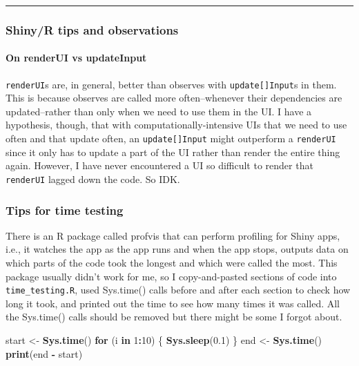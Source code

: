 \documentclass[]{article}
\newenvironment{Shaded}{\begin{snugshade}}{\end{snugshade}}
\newcommand{\KeywordTok}[1]{\textcolor[rgb]{0.13,0.29,0.53}{\textbf{#1}}}
\newcommand{\DecValTok}[1]{\textcolor[rgb]{0.00,0.00,0.81}{#1}}
\newcommand{\FloatTok}[1]{\textcolor[rgb]{0.00,0.00,0.81}{#1}}
\newcommand{\StringTok}[1]{\textcolor[rgb]{0.31,0.60,0.02}{#1}}
\newcommand{\ControlFlowTok}[1]{\textcolor[rgb]{0.13,0.29,0.53}{\textbf{#1}}}
\newcommand{\OperatorTok}[1]{\textcolor[rgb]{0.81,0.36,0.00}{\textbf{#1}}}
\newcommand{\NormalTok}[1]{#1}
\let\oldparagraph\paragraph
\renewcommand{\paragraph}[1]{\oldparagraph{#1}\mbox{}}
\begin{document}
\begin{center}\rule{0.5\linewidth}{\linethickness}\end{center}

\hypertarget{observations}{\subsubsection{Shiny/R tips and
observations}\label{observations}}

\paragraph{On renderUI vs updateInput}\label{on-renderui-vs-updateinput}

\texttt{renderUI}s are, in general, better than observes with
\texttt{update{[}{]}Input}s in them. This is because observes are called
more often--whenever their dependencies are updated--rather than only
when we need to use them in the UI. I have a hypothesis, though, that
with computationally-intensive UIs that we need to use often and that
update often, an \texttt{update{[}{]}Input} might outperform a
\texttt{renderUI} since it only has to update a part of the UI rather
than render the entire thing again. However, I have never encountered a
UI so difficult to render that \texttt{renderUI} lagged down the code.
So IDK.

\hypertarget{time-testing}{\subsubsection{Tips for time
testing}\label{time-testing}}

There is an R package called profvis that can perform profiling for
Shiny apps, i.e., it watches the app as the app runs and when the app
stops, outputs data on which parts of the code took the longest and
which were called the most. This package usually didn't work for me, so
I copy-and-pasted sections of code into \texttt{time\_testing.R}, used
Sys.time() calls before and after each section to check how long it
took, and printed out the time to see how many times it was called. All
the Sys.time() calls should be removed but there might be some I forgot
about.

\begin{Shaded}
\begin{Highlighting}[]
\NormalTok{start <-}\StringTok{ }\KeywordTok{Sys.time}\NormalTok{()}
\ControlFlowTok{for}\NormalTok{ (i }\ControlFlowTok{in} \DecValTok{1}\OperatorTok{:}\DecValTok{10}\NormalTok{) \{}
  \KeywordTok{Sys.sleep}\NormalTok{(}\FloatTok{0.1}\NormalTok{)}
\NormalTok{\}}
\NormalTok{end <-}\StringTok{ }\KeywordTok{Sys.time}\NormalTok{()}
\KeywordTok{print}\NormalTok{(end }\OperatorTok{-}\StringTok{ }\NormalTok{start)}
\end{Highlighting}
\end{Shaded}
\end{document}
